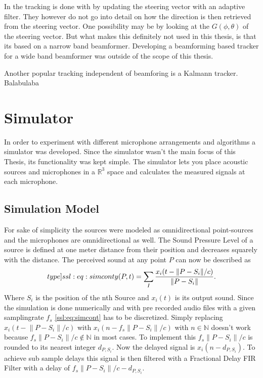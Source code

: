 In \cite{Dorne tracker} the tracking is done with by 
updating the steering vector with an adaptive filter. 
They however do not go into detail on how the direction is then
retrieved from the steering vector.
One possibility may be by looking at the $G(\phi, \theta)$ of the steering vector.
But what makes this definitely not used in this thesis, is that its based on a 
narrow band beamformer. 
Developing a beamforming based tracker for a wide band beamformer was outside of the 
scope of this thesis.

Another popular tracking independent of beamforing is a Kalmann tracker.
Balabulaba

\newpage
\section{Simulator}
In order to experiment with different microphone arrangements and algorithms a simulator was developed.
Since the simulator wasn't the main focus of this Thesis, its functionality was kept simple.
The simulator lets you place acoustic sources and microphones in a $\mathbb{R}^3$ space and calculates
the measured signals at each microphone.

\subsection{Simulation Model}
For sake of simplicity the sources were modeled as omnidirectional point-sources and the
microphones are omnidirectional as well.
The Sound Pressure Level of a source is defined at one meter distance from their position and decreases
squarely with the distance.
The perceived sound at any point $P$ can now be described as
\begin{equation}
	\label[type]{ssl:eq:simcont}
	y(P, t) = \sum_{I} \frac{x_i(t - \lVert P - S_i\rVert/c)}{\lVert P - S_i\rVert}.
\end{equation}
Where $S_i$ is the position of the nth Source and $x_i(t)$ is its output sound.
Since the simulation is done numerically and with pre recorded audio files with a given
samplingrate $f_s$ \eqref{ssl:eq:simcont} has to be discretized.
Simply replacing $x_i(t - \lVert P - S_i\rVert/c)$ with
$x_i(n - f_s \lVert P - S_i\rVert/c)$ with
$n \in \mathbb{N}$ doesn't work because
$f_s \lVert P - S_i\rVert/c \not \in \mathbb{N}$ in most cases.
To implement this $f_s \lVert P - S_i\rVert/c$ is rounded to
its nearest integer $d_{P,S_i}$.
Now the delayed signal is $x_i(n - d_{P,S_i})$.
To achieve sub sample delays this signal is then filtered
with a Fractional Delay FIR Filter with a delay of
$f_s \lVert P - S_i\rVert/c - d_{P,S_i}$.

